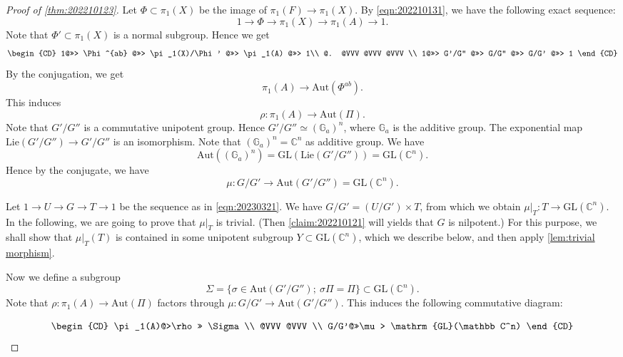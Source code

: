 \documentclass[11pt,english]{smfart}
\theoremstyle{plain}
\theoremstyle{definition}
\theoremstyle{remark}
\numberwithin{equation}{subsection}
\theoremstyle{plain}
\begin{document}
\begin{proof}[Proof of \cref{thm:202210123}]
Let $\Phi\subset \pi_1(X)$ be the image of $\pi_1(F)\to \pi_1(X)$.
By \eqref{eqn:202210131}, we have the following exact sequence:
$$
1\to \Phi\to\pi_1(X)\to \pi_1(A)\to 1.
$$
Note that $\Phi'\subset \pi_1(X)$ is a normal subgroup.
Hence we get
\begin{equation*}
\begin{CD}
1@>>> \Phi^{ab} @>>> \pi _1(X)/\Phi' @>>> \pi _1(A) @>>> 1\\
@. @VVV @VVV @VVV \\
1@>>> G'/G'' @>>> G/G'' @>>> G/G' @>>> 1
\end{CD}
\end{equation*}
By the conjugation, we get 
\begin{equation*}
\pi_1(A)\to \mathrm{Aut}(\Phi^{ab}).
\end{equation*}
This induces
\begin{equation*}
\rho:\pi_1(A)\to \mathrm{Aut}(\Pi).
\end{equation*}
Note that $G'/G''$ is a commutative unipotent group.
Hence $G'/G''\simeq (\mathbb G_a)^n$, where $\mathbb G_a$ is the additive group.
The exponential map $\mathrm{Lie}(G'/G'')\to G'/G''$ is an isomorphism. 
Note that $(\mathbb G_a)^n=\mathbb C^n$ as additive group.
We have 
$$\mathrm{Aut}((\mathbb G_a)^n)=\mathrm{GL}(\mathrm{Lie}(G'/G''))=\mathrm{GL}(\mathbb C^n).
$$
Hence by the conjugate, we have 
$$
\mu:G/G'\to \mathrm{Aut}(G'/G'')=\mathrm{GL}(\mathbb C^n).
$$

Let $1\to U\to G\to T\to 1$ be the sequence as in \eqref{eqn:20230321}.
We have $G/G'=(U/G')\times T$, from which we obtain $\mu|_T:T\to\mathrm{GL}(\mathbb C^n) $.
In the following, we are going to prove that $\mu|_T$ is trivial.
(Then \cref{claim:202210121} will yields that $G$ is nilpotent.)
For this purpose, we shall show that $\mu|_T(T)$ is contained in some unipotent subgroup $Y\subset \mathrm{GL}(\mathbb C^n)$, which we describe below, and then apply \cref{lem:trivial morphism}.


Now we define a subgroup 
$$\Sigma=\{ \sigma\in\mathrm{Aut}(G'/G'');\ \sigma\Pi= \Pi\}\subset \mathrm{GL}(\mathbb C^n).$$
Note that $\rho:\pi_1(A)\to \mathrm{Aut}(\Pi)$ factors through $\mu:G/G'\to \mathrm{Aut}(G'/G'')$.
This induces the following commutative diagram:

\begin{equation}\label{eqn:202210141}
\begin{CD}
\pi _1(A)@>\rho>> \Sigma \\
@VVV @VVV \\
G/G'@>>\mu> \mathrm{GL}(\mathbb C^n)
\end{CD}
\end{equation}



\end{proof}
\end{document}
